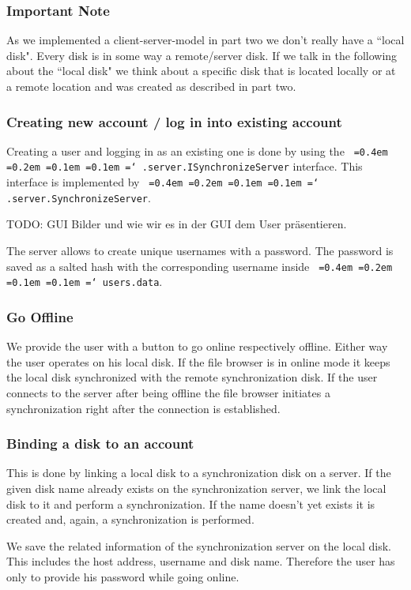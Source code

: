 \documentclass[a4paper,12pt]{article}
\newcommand*\justify{%
  \fontdimen2\font=0.4em%
  \fontdimen3\font=0.2em%
  \fontdimen4\font=0.1em%
  \fontdimen7\font=0.1em%
  \hyphenchar\font=`\-%
}
\newcommand{\mono}[1]{\texttt{\justify #1}}
\begin{document}
\subsubsection{Important Note}
As we implemented a client-server-model in part two we don't really have a ``local disk". Every disk is in some way a remote/server disk. If we talk in the following about the ``local disk" we think about a specific disk that is located locally or at a remote location and was created as described in part two.

\subsubsection{Creating new account / log in into existing account}
Creating a user and logging in as an existing one is done by using the \mono{.server.ISynchronizeServer} interface. This interface is implemented by \mono{.server.SynchronizeServer}.

TODO: GUI Bilder und wie wir es in der GUI dem User präsentieren.

The server allows to create unique usernames with a password. The password is saved as a salted hash with the corresponding username inside \mono{users.data}.

\subsubsection{Go Offline}
We provide the user with a button to go online respectively offline. Either way the user operates on his local disk. If the file browser is in online mode it keeps the local disk synchronized with the remote synchronization disk. If the user connects to the server after being offline the file browser initiates a synchronization right after the connection is established.

\subsubsection{Binding a disk to an account}
This is done by linking a local disk to a synchronization disk on a server. If the given disk name already exists on the synchronization server, we link the local disk to it and perform a synchronization. If the name doesn't yet exists it is created and, again, a synchronization is performed.

We save the related information of the synchronization server on the local disk. This includes the host address, username and disk name. Therefore the user has only to provide his password while going online.
\end{document}
